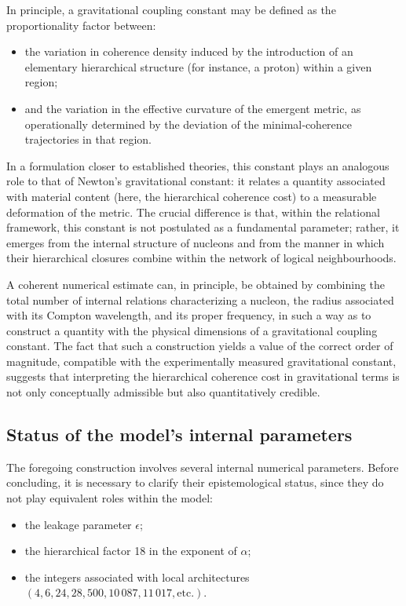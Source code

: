 \documentclass[11pt,a4paper]{article}
\begin{document}
In principle, a gravitational coupling constant may be defined as the proportionality factor between:
\begin{itemize}[label=-]
  \item the variation in coherence density induced by the introduction of an elementary hierarchical structure (for instance, a proton) within a given region;
  \item and the variation in the effective curvature of the emergent metric, as operationally determined by the deviation of the minimal‑coherence trajectories in that region.
\end{itemize}
In a formulation closer to established theories, this constant plays an analogous role to that of Newton’s gravitational constant: it relates a quantity associated with material content (here, the hierarchical coherence cost) to a measurable deformation of the metric. The crucial difference is that, within the relational framework, this constant is not postulated as a fundamental parameter; rather, it emerges from the internal structure of nucleons and from the manner in which their hierarchical closures combine within the network of logical neighbourhoods.

A coherent numerical estimate can, in principle, be obtained by combining the total number of internal relations characterizing a nucleon, the radius associated with its Compton wavelength, and its proper frequency, in such a way as to construct a quantity with the physical dimensions of a gravitational coupling constant. The fact that such a construction yields a value of the correct order of magnitude, compatible with the experimentally measured gravitational constant, suggests that interpreting the hierarchical coherence cost in gravitational terms is not only conceptually admissible but also quantitatively credible.

\subsection{Status of the model’s internal parameters}
The foregoing construction involves several internal numerical parameters. Before concluding, it is necessary to clarify their epistemological status, since they do not play equivalent roles within the model:
\begin{itemize}[label=-]
  \item the leakage parameter \(\epsilon\);
  \item the hierarchical factor 18 in the exponent of \(\alpha\);
  \item the integers associated with local architectures \((4, 6, 24, 28, 500, 10\,087, 11\,017, \text{etc.})\).
\end{itemize}
\end{document}

